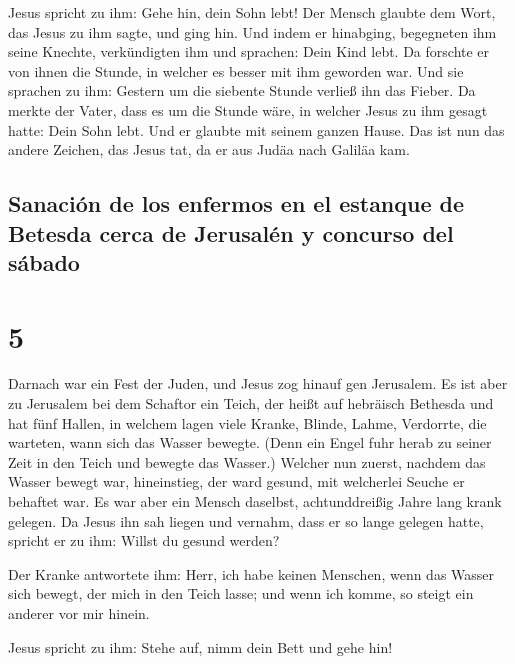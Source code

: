 Jesus spricht zu ihm: Gehe hin, dein Sohn lebt! Der
Mensch glaubte dem Wort, das Jesus zu ihm sagte, und ging hin.
 Und indem er hinabging, begegneten ihm seine Knechte,
verkündigten ihm und sprachen: Dein Kind lebt.  Da
forschte er von ihnen die Stunde, in welcher es besser mit ihm geworden
war. Und sie sprachen zu ihm: Gestern um die siebente Stunde verließ ihn
das Fieber.  Da merkte der Vater, dass es um die Stunde
wäre, in welcher Jesus zu ihm gesagt hatte: Dein Sohn lebt. Und er
glaubte mit seinem ganzen Hause.  Das ist nun das andere
Zeichen, das Jesus tat, da er aus Judäa nach Galiläa kam.

\hypertarget{sanaciuxf3n-de-los-enfermos-en-el-estanque-de-betesda-cerca-de-jerusaluxe9n-y-concurso-del-suxe1bado}{%
\subsection{Sanación de los enfermos en el estanque de Betesda cerca de
Jerusalén y concurso del
sábado}\label{sanaciuxf3n-de-los-enfermos-en-el-estanque-de-betesda-cerca-de-jerusaluxe9n-y-concurso-del-suxe1bado}}

\hypertarget{section-4}{%
\section{5}\label{section-4}}

 Darnach war ein Fest der Juden, und Jesus zog hinauf gen
Jerusalem.  Es ist aber zu Jerusalem bei dem Schaftor ein
Teich, der heißt auf hebräisch Bethesda und hat fünf Hallen,
 in welchem lagen viele Kranke, Blinde, Lahme, Verdorrte,
die warteten, wann sich das Wasser bewegte.  (Denn ein
Engel fuhr herab zu seiner Zeit in den Teich und bewegte das Wasser.)
Welcher nun zuerst, nachdem das Wasser bewegt war, hineinstieg, der ward
gesund, mit welcherlei Seuche er behaftet war.  Es war
aber ein Mensch daselbst, achtunddreißig Jahre lang krank gelegen.
 Da Jesus ihn sah liegen und vernahm, dass er so lange
gelegen hatte, spricht er zu ihm: Willst du gesund werden?

 Der Kranke antwortete ihm: Herr, ich habe keinen
Menschen, wenn das Wasser sich bewegt, der mich in den Teich lasse; und
wenn ich komme, so steigt ein anderer vor mir hinein.

 Jesus spricht zu ihm: Stehe auf, nimm dein Bett und gehe
hin!

